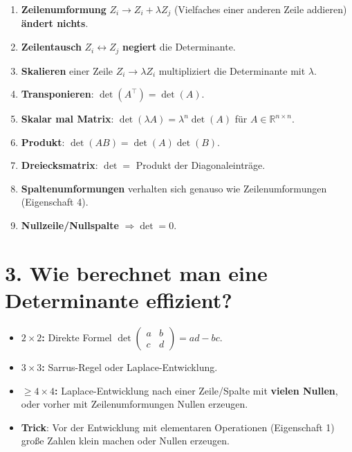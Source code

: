 \documentclass[a4paper,12pt]{article}
\begin{document}
\begin{merkbox}[title={Eigenschaften (musst du im Schlaf k\"onnen)}]
\begin{enumerate}[nosep]
    \item \textbf{Zeilenumformung} $Z_i \to Z_i + \lambda Z_j$ (Vielfaches einer anderen Zeile addieren) \textbf{\"andert nichts}.
    \item \textbf{Zeilentausch} $Z_i \leftrightarrow Z_j$ \textbf{negiert} die Determinante.
    \item \textbf{Skalieren} einer Zeile $Z_i \to \lambda Z_i$ multipliziert die Determinante mit $\lambda$.
    \item \textbf{Transponieren}: $\det(A^\top) = \det(A)$.
    \item \textbf{Skalar mal Matrix}: $\det(\lambda A) = \lambda^n \det(A)$ f\"ur $A \in \mathbb{R}^{n\times n}$.
    \item \textbf{Produkt}: $\det(AB) = \det(A) \det(B)$.
    \item \textbf{Dreiecksmatrix}: $\det = $ Produkt der Diagonaleintr\"age.
    \item \textbf{Spaltenumformungen} verhalten sich genauso wie Zeilenumformungen (Eigenschaft 4).
    \item \textbf{Nullzeile/Nullspalte} $\Rightarrow \det = 0$.
\end{enumerate}
\end{merkbox}

\section*{3. Wie berechnet man eine Determinante effizient?}

\begin{merkbox}[title={Strategie}]
\begin{itemize}[nosep]
    \item \textbf{$2\times 2$:} Direkte Formel $\det \begin{pmatrix} a & b \\ c & d \end{pmatrix} = ad - bc$.
    \item \textbf{$3 \times 3$:} Sarrus-Regel oder Laplace-Entwicklung.
    \item \textbf{$\geq 4 \times 4$:} Laplace-Entwicklung nach einer Zeile/Spalte mit \textbf{vielen Nullen}, oder vorher mit Zeilenumformungen Nullen erzeugen.
    \item \textbf{Trick}: Vor der Entwicklung mit elementaren Operationen (Eigenschaft 1) gro\ss e Zahlen klein machen oder Nullen erzeugen.
\end{itemize}
\end{merkbox}
\end{document}
